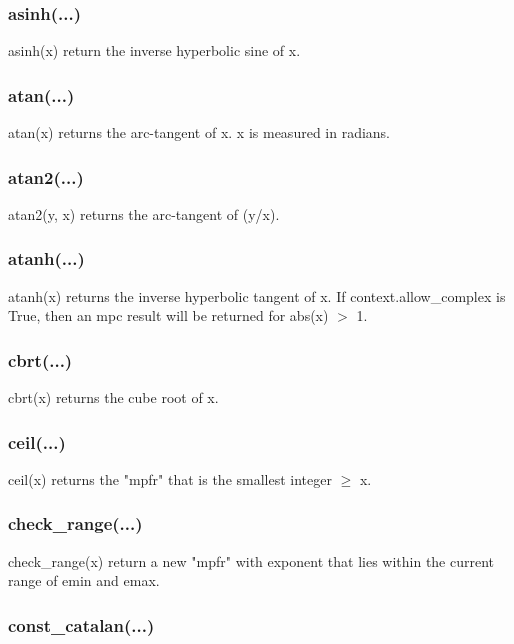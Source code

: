 \subsubsection{asinh(...)}

asinh(x) return the inverse hyperbolic sine of x.

\subsubsection{atan(...)}

atan(x) returns the arc-tangent of x. x is measured in radians.

\subsubsection{atan2(...)}

atan2(y, x) returns the arc-tangent of (y/x).

\subsubsection{atanh(...)}

atanh(x) returns the inverse hyperbolic tangent of x. If context.allow\_complex is True, then an
mpc result will be returned for abs(x) $>$ 1.

\subsubsection{cbrt(...)}

cbrt(x) returns the cube root of x.

\subsubsection{ceil(...)}

ceil(x) returns the "mpfr" that is the smallest integer $\ge$ x.

\subsubsection{check\_range(...)}

check\_range(x) return a new "mpfr" with exponent that lies within the current range of emin and
emax.

\subsubsection{const\_catalan(...)}

